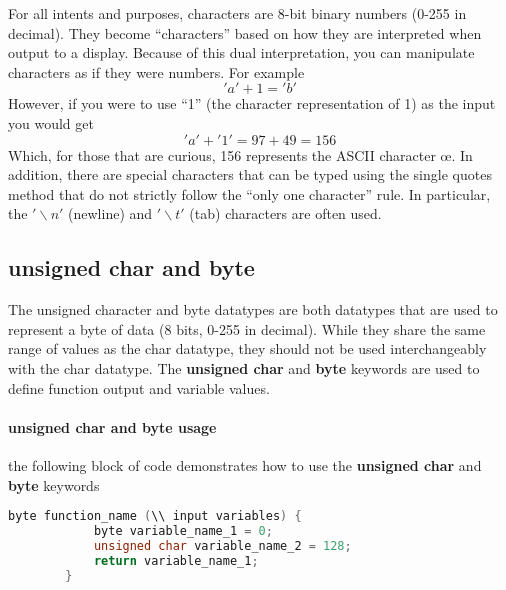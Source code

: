     \begin{kaobox}[frametitle=Aside: Some quirks with characters]
        For all intents and purposes, characters are 8-bit binary numbers (0-255 in decimal). They become \enquote{characters} based on how they are interpreted when output to
        a display. Because of this dual interpretation, you can manipulate characters as if they were numbers. For example
        \begin{equation*}
            'a' + 1 = 'b'
        \end{equation*}
        However, if you were to use \enquote{1} (the character representation of 1) as the input you would get
        \begin{equation*}
            'a' + '1' = 97 + 49 = 156
        \end{equation*} 
        Which, for those that are curious, 156 represents the ASCII character \oe. In addition, there are special characters that can be typed using the single quotes 
        method that do not strictly follow the \enquote{only one character} rule. In particular, the $'\backslash n'$ (newline) and $'\backslash t'$ (tab) characters are often used.
    \end{kaobox}

    \subsection{unsigned char and byte}
    The unsigned character and byte datatypes are both datatypes that are used to represent a byte of data (8 bits, 0-255 in decimal). While they share the same range of values
    as the char datatype, they should not be used interchangeably with the char datatype. The \textbf{unsigned char} and \textbf{byte} keywords are used to define function output
    and variable values.
    \paragraph*{unsigned char and byte usage} the following block of code demonstrates how to use the \textbf{unsigned char} and \textbf{byte} keywords
    \begin{lstlisting}[linewidth=1.5\textwidth, language=C++]
        byte function_name (\\ input variables) {
            byte variable_name_1 = 0;
            unsigned char variable_name_2 = 128;
            return variable_name_1;
        }\end{lstlisting}


